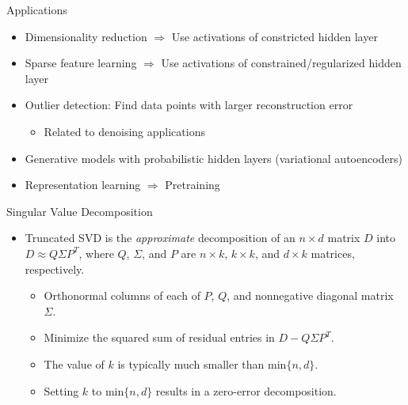 \begin{frame}{Applications}
\begin{itemize}
\item Dimensionality reduction $\Rightarrow$ Use activations of
constricted hidden layer
\item Sparse feature learning $\Rightarrow$ Use activations of
constrained/regularized hidden layer
\item Outlier detection: Find data points with larger reconstruction
error
\begin{itemize}
\item Related to denoising applications
\end{itemize}
\item Generative models with probabilistic hidden layers
(variational autoencoders)
\item Representation learning $\Rightarrow$ Pretraining
\end{itemize}
\end{frame}




\begin{frame}{Singular Value Decomposition}
\begin{itemize}
\item Truncated SVD is the {\em approximate} decomposition of an $n \times d$ matrix $D$ into
$D \approx Q \Sigma P^T$, where  $Q$, $\Sigma$, and $P$ are $n
\times k$, $k \times k$, and $d \times k$ matrices, respectively.
\begin{itemize}
\item Orthonormal columns of  each of $P$, $Q$, and nonnegative
diagonal matrix $\Sigma$.
\item Minimize the squared sum of residual entries in $D - Q \Sigma P^T$.
\item The value of $k$ is typically much smaller than  $\mbox{min}\{ n, d
\}$.
\item Setting $k$ to  $\mbox{min}\{ n, d \}$ results in a zero-error decomposition.
\end{itemize}
\end{itemize}
\end{frame}


